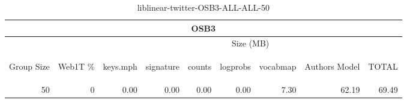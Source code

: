 \begin{center}
\begin{table}[htbp] 
 \begin{center}
\begin{tabular}{ | r | r | r | r | r | r | r | r | r |}
\hline
\multicolumn{9}{|c|}{OSB3}\\
\hline
 & & \multicolumn{7}{|c|}{Size (MB)}\\ \cline{3-9}
\begin{sideways}Group Size\end{sideways} & \begin{sideways}Web1T \% \end{sideways} & \begin{sideways}keys.mph\end{sideways} & \begin{sideways}signature\end{sideways} & \begin{sideways}counts\end{sideways} & \begin{sideways}logprobs\end{sideways} & \begin{sideways}vocabmap\end{sideways} & \begin{sideways}Authors Model \end{sideways} & \begin{sideways}TOTAL\end{sideways}\\
\hline
\multirow{0}{*}{50}
 & 0 & 0.00 & 0.00 & 0.00 & 0.00 & 7.30 & 62.19 & 69.49\\ \cline{2-9}
\hline
\end{tabular}
\caption{liblinear-twitter-OSB3-ALL-ALL-50}
\label{table:liblinear-twitter-OSB3-ALL-ALL-50}
\end{center}
 \end{table}
\end{center}

